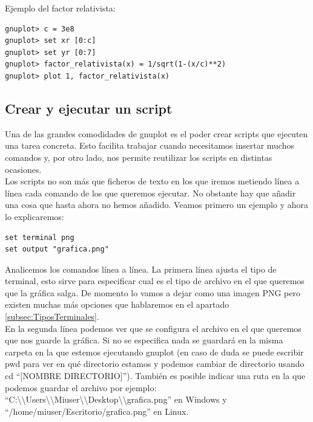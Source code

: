 \documentclass[11pt,a4paper,twoside,pdf]{article}
\numberwithin{equation}{section}
\begin{document}
Ejemplo del factor relativista:

\begin{lstlisting}[language=Gnuplot]
gnuplot> c = 3e8
gnuplot> set xr [0:c]
gnuplot> set yr [0:7]
gnuplot> factor_relativista(x) = 1/sqrt(1-(x/c)**2)
gnuplot> plot 1, factor_relativista(x)
\end{lstlisting}

\subsection{Crear y ejecutar un script}

Una de las grandes comodidades de gnuplot es el poder crear scripts que ejecuten una tarea concreta. Esto facilita trabajar cuando necesitamos insertar muchos comandos y, por otro lado, nos permite reutilizar los scripts en distintas ocasiones. \\

Los scripts no son más que ficheros de texto en los que iremos metiendo línea a línea cada comando de los que queremos ejecutar. No obstante hay que añadir una cosa que hasta ahora no hemos añadido. Veamos primero un ejemplo y ahora lo explicaremos:

\begin{lstlisting}[language=Gnuplot]
set terminal png
set output "grafica.png"
\end{lstlisting}

Analicemos los comandos línea a línea. La primera línea ajusta el tipo de terminal, esto sirve para especificar cual es el tipo de archivo en el que queremos que la gráfica salga. De momento lo vamos a dejar como una imagen PNG pero existen muchas más opciones que hablaremos en el apartado \ref{subsec:TiposTerminales}. \\

En la segunda línea podemos ver que se configura el archivo en el que queremos que nos guarde la gráfica. Si no se especifica nada se guardará en la misma carpeta en la que estemos ejecutando gnuplot (en caso de duda se puede escribir pwd para ver en qué directorio estamos y podemos cambiar de directorio usando cd ``[NOMBRE DIRECTORIO]''). También es posible indicar una ruta en la que podemos guardar el archivo por ejemplo: ``C:\textbackslash\textbackslash Users\textbackslash\textbackslash Miuser\textbackslash\textbackslash Desktop\textbackslash\textbackslash grafica.png'' en Windows y ``/home/miuser/Escritorio/grafica.png'' en Linux. \\
\end{document}
